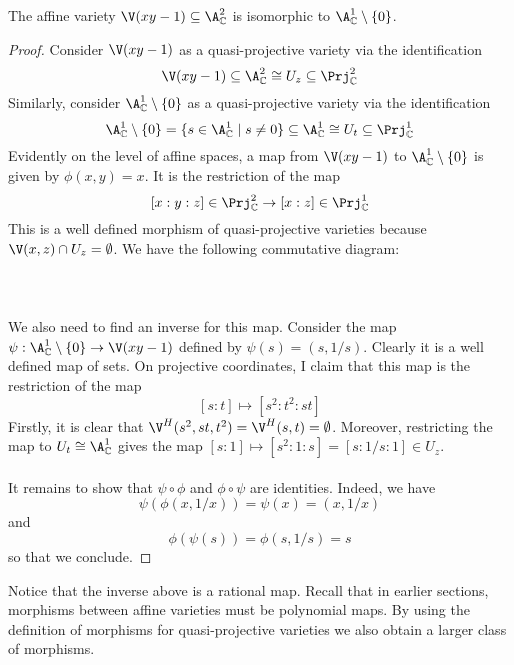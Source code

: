 \documentclass[a4paper]{article}
\begin{document}
\begin{eg}{}{} The affine variety $\V(xy-1)\subseteq\A_\C^2$ is isomorphic to $\A_\C^1\setminus\{0\}$. 
\begin{proof}
Consider $\V(xy-1)$ as a quasi-projective variety via the identification $$\V(xy-1)\subseteq\A_\C^2\cong U_z\subseteq\Prj_\C^2$$ Similarly, consider $\A_\C^1\setminus\{0\}$ as a quasi-projective variety via the identification $$\A_\C^1\setminus\{0\}=\{s\in\A_\C^1\;|\;s\neq 0\}\subseteq\A_\C^1\cong U_t\subseteq\Prj_\C^1$$ Evidently on the level of affine spaces, a map from $\V(xy-1)$ to $\A_\C^1\setminus\{0\}$ is given by $\phi(x,y)=x$. It is the restriction of the map $$[x:y:z]\in\Prj_\C^2\to[x:z]\in\Prj_\C^1$$ This is a well defined morphism of quasi-projective varieties because $\V(x,z)\cap U_z=\emptyset$. We have the following commutative diagram: \\~\\
 \\~\\
We also need to find an inverse for this map. Consider the map $\psi:\A_\C^1\setminus\{0\}\to\V(xy-1)$ defined by $\psi(s)=(s,1/s)$. Clearly it is a well defined map of sets. On projective coordinates, I claim that this map is the restriction of the map $$[s:t]\mapsto[s^2:t^2:st]$$ Firstly, it is clear that $\V^H(s^2,st,t^2)=\V^H(s,t)=\emptyset$. Moreover, restricting the map to $U_t\cong\A_\C^1$ gives the map $[s:1]\mapsto[s^2:1:s]=[s:1/s:1]\in U_z$. \\~\\

It remains to show that $\psi\circ\phi$ and $\phi\circ\psi$ are identities. Indeed, we have $$\psi(\phi(x,1/x))=\psi(x)=(x,1/x)$$ and $$\phi(\psi(s))=\phi(s,1/s)=s$$ so that we conclude. 
\end{proof}
\end{eg}

Notice that the inverse above is a rational map. Recall that in earlier sections, morphisms between affine varieties must be polynomial maps. By using the definition of morphisms for quasi-projective varieties we also obtain a larger class of morphisms. \\
\end{document}
